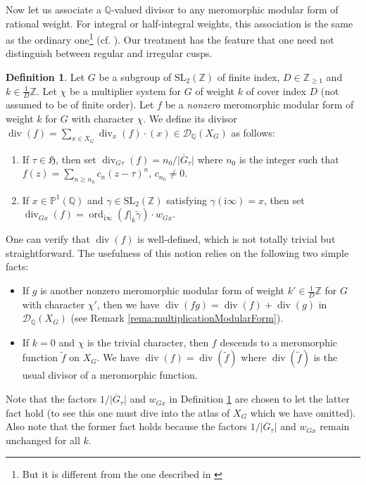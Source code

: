 \documentclass[12pt]{amsart}
\numberwithin{equation}{section}
\theoremstyle{plain}
\theoremstyle{definition}
\newtheorem{deff}[thm]{Definition}
\theoremstyle{remark}
\newcommand\rmi{\mathrm{i}}
\newcommand*\abs[1]{\lvert#1\rvert}
\newcommand\ord{\mathop{\mathrm{ord}}}
\renewcommand\div{\mathop{\mathrm{div}}}
\newcommand\numZ{\mathbb{Z}}
\newcommand\numQ{\mathbb{Q}}
\newcommand\projQ{\mathbb{P}^1(\mathbb{Q})}
\newcommand\numgeq[2]{\mathbb{#1}_{\geq #2}}
\newcommand\slZ{\mathrm{SL}_2(\mathbb{Z})}
\newcommand\uhp{\mathfrak{H}}
\begin{document}
Now let us associate a $\numQ$-valued divisor to any meromorphic modular form of rational weight. For integral or half-integral weights, this association is the same as the ordinary one\footnote{But it is different from the one described in \cite[p. 299]{Fri11}} (cf. \cite[Eq. (3.2) and (3.3)]{DS05}). Our treatment has the feature that one need not distinguish between regular and irregular cusps.
\begin{deff}
\label{deff:divisorModularForm}
Let $G$ be a subgroup of $\slZ$ of finite index, $D\in\numgeq{Z}{1}$ and $k\in\frac{1}{D}\numZ$. Let $\chi$ be a multiplier system for $G$ of weight $k$ of cover index $D$ (not assumed to be of finite order). Let $f$ be a \emph{nonzero} meromorphic modular form of weight $k$ for $G$ with character $\chi$. We define its divisor $\div(f)=\sum_{x\in X_G}\div_x(f)\cdot(x)\in\mathscr{D}_\numQ(X_G)$ as follows:
\begin{enumerate}
  \item If $\tau\in\uhp$, then set $\div_{G\tau}(f)=n_0/\abs{\overline{G}_\tau}$ where $n_0$ is the integer such that $f(z)=\sum_{n\geq n_0}c_n(z-\tau)^n$, $c_{n_0}\neq 0$.
  \item If $x\in\projQ$ and $\gamma\in\slZ$ satisfying $\gamma(\rmi\infty)=x$, then set $\div_{Gx}(f)=\ord_{\rmi\infty}(f\vert_k\widetilde{\gamma})\cdot w_{Gx}$.
\end{enumerate}
\end{deff}
One can verify that $\div(f)$ is well-defined, which is not totally trivial but straightforward. The usefulness of this notion relies on the following two simple facts:
\begin{itemize}
  \item If $g$ is another nonzero meromorphic modular form of weight $k'\in\frac{1}{D}\numZ$ for $G$ with character $\chi'$, then we have $\div(fg)=\div(f)+\div(g)$ in $\mathscr{D}_\numQ(X_G)$ (see Remark \ref{rema:multiplicationModularForm}).
  \item If $k=0$ and $\chi$ is the trivial character, then $f$ descends to a meromorphic function $\widetilde{f}$ on $X_G$. We have $\div(f)=\div(\widetilde{f})$ where $\div(\widetilde{f})$ is the usual divisor of a meromorphic function.
\end{itemize}
Note that the factors $1/\abs{\overline{G}_\tau}$ and $w_{Gx}$ in Definition \ref{deff:divisorModularForm} are chosen to let the latter fact hold (to see this one must dive into the atlas of $X_G$ which we have omitted). Also note that the former fact holds because the factors $1/\abs{\overline{G}_\tau}$ and $w_{Gx}$ remain unchanged for all $k$.
\end{document}

